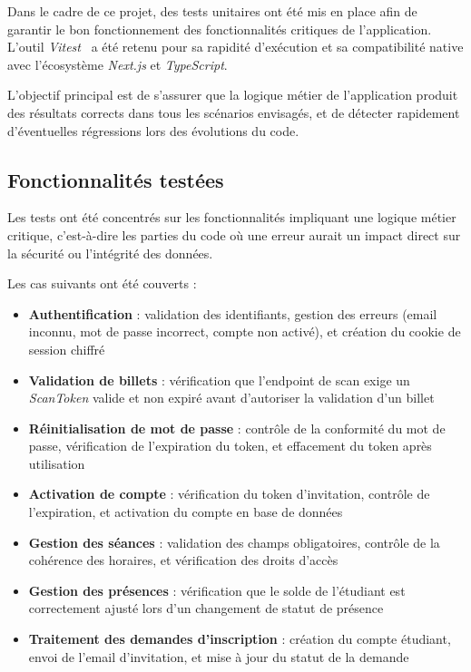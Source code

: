 \documentclass{article}
\begin{document}
Dans le cadre de ce projet, des tests unitaires ont été mis en place afin 
de garantir le bon fonctionnement des fonctionnalités critiques de 
l'application. L'outil \textit{Vitest}~\cite{vitest} a été retenu pour sa rapidité 
d'exécution et sa compatibilité native avec l'écosystème \textit{Next.js} 
et \textit{TypeScript}.

L'objectif principal est de s'assurer que la logique métier de l'application 
produit des résultats corrects dans tous les scénarios envisagés, et de 
détecter rapidement d'éventuelles régressions lors des évolutions du code.

\subsection{Fonctionnalités testées}

Les tests ont été concentrés sur les fonctionnalités impliquant une logique 
métier critique, c'est-à-dire les parties du code où une erreur aurait un 
impact direct sur la sécurité ou l'intégrité des données.

Les cas suivants ont été couverts :

\begin{itemize}
    \item \textbf{Authentification} : validation des identifiants, gestion 
    des erreurs (email inconnu, mot de passe incorrect, compte non activé), 
    et création du cookie de session chiffré
    \item \textbf{Validation de billets} : vérification que l'endpoint de 
    scan exige un \textit{ScanToken} valide et non expiré avant d'autoriser 
    la validation d'un billet
    \item \textbf{Réinitialisation de mot de passe} : contrôle de la 
    conformité du mot de passe, vérification de l'expiration du token, 
    et effacement du token après utilisation
    \item \textbf{Activation de compte} : vérification du token d'invitation, 
    contrôle de l'expiration, et activation du compte en base de données
    \item \textbf{Gestion des séances} : validation des champs obligatoires, 
    contrôle de la cohérence des horaires, et vérification des droits d'accès
    \item \textbf{Gestion des présences} : vérification que le solde de 
    l'étudiant est correctement ajusté lors d'un changement de statut de 
    présence
    \item \textbf{Traitement des demandes d'inscription} : création du 
    compte étudiant, envoi de l'email d'invitation, et mise à jour du statut 
    de la demande
\end{itemize}
\end{document}
